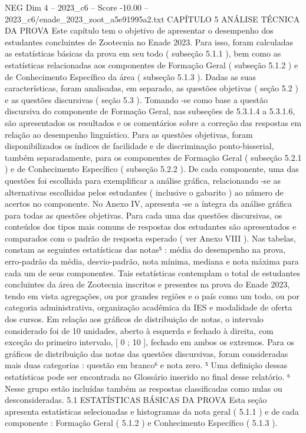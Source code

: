 \begin{textsample}{NEG Dim 4 – 2023\_c6 – Score -10.00 – 2023\_c6/enade\_2023\_zoot\_a5e91995a2.txt}  \label{ex:f4_neg_003}
CAPÍTULO 5 ANÁLISE TÉCNICA DA PROVA Este capítulo tem o objetivo de apresentar o desempenho dos estudantes concluintes de Zootecnia no Enade 2023.
Para isso, foram calculadas as estatísticas básicas da prova em seu todo ( subseção 5.1.1 ), bem como as estatísticas relacionadas aos componentes de Formação Geral ( subseção 5.1.2 ) e de Conhecimento Específico da área ( subseção 5.1.3 ).
Dadas as suas características, foram analisadas, em separado, as questões objetivas ( seção 5.2 ) e as questões discursivas ( seção 5.3 ).
Tomando -se como base a questão discursiva do componente de Formação Geral, nas subseções de 5.3.1.4 a 5.3.1.6, são apresentados os resultados e os comentários sobre a correção das respostas em relação ao desempenho linguístico.
Para as questões objetivas, foram disponibilizados os índices de facilidade e de discriminação ponto-bisserial, também separadamente, para os componentes de Formação Geral ( subseção 5.2.1 ) e de Conhecimento Específico ( subseção 5.2.2 ).
De cada componente, uma das questões foi escolhida para exemplificar a análise gráfica, relacionando -se as alternativas escolhidas pelos estudantes ( inclusive o gabarito ) ao número de acertos no componente.
No Anexo IV, apresenta -se a íntegra da análise gráfica para todas as questões objetivas.
Para cada uma das questões discursivas, os conteúdos dos tipos mais comuns de respostas dos estudantes são apresentados e comparados com o padrão de resposta esperado ( ver Anexo VIII ).
Nas tabelas, constam as seguintes estatísticas das notas⁵ : média do desempenho na prova, erro-padrão da média, desvio-padrão, nota mínima, mediana e nota máxima para cada um de seus componentes.
Tais estatísticas contemplam o total de estudantes concluintes da área de Zootecnia inscritos e presentes na prova do Enade 2023, tendo em vista agregações, ou por grandes regiões e o país como um todo, ou por categoria administrativa, organização acadêmica da IES e modalidade de oferta dos cursos.
Em relação aos gráficos de distribuição de notas, o intervalo considerado foi de 10 unidades, aberto à esquerda e fechado à direita, com exceção do primeiro intervalo, [ 0 ; 10 ], fechado em ambos os extremos.
Para os gráficos de distribuição das notas das questões discursivas, foram consideradas mais duas categorias : questão em branco⁶ e nota zero. ⁵ Uma definição dessas estatísticas pode ser encontrada no Glossário inserido no final desse relatório. ⁶ Nesse grupo estão incluídas também as respostas classificadas como nulas ou desconsideradas. 5.1 ESTATÍSTICAS BÁSICAS DA PROVA Esta seção apresenta estatísticas selecionadas e histogramas da nota geral ( 5.1.1 ) e de cada componente : Formação Geral ( 5.1.2 ) e Conhecimento Específico ( 5.1.3 ).

\end{textsample}
